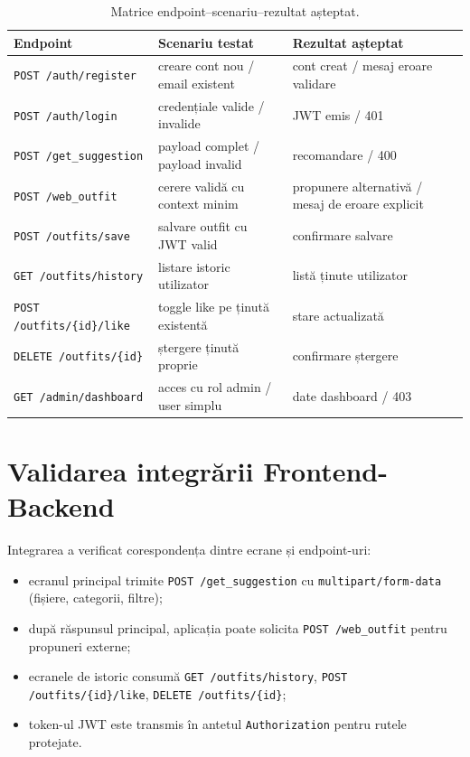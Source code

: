 \begin{table}[h]
    \centering
    \begin{tabular}{|p{3.8cm}|p{5cm}|p{3.2cm}|}
    \hline
    \textbf{Endpoint} & \textbf{Scenariu testat} & \textbf{Rezultat așteptat} \\ \hline
    \texttt{POST /auth/register} & creare cont nou / email existent & cont creat / mesaj eroare validare \\ \hline
    \texttt{POST /auth/login} & credențiale valide / invalide & JWT emis / 401 \\ \hline
    \texttt{POST /get\_suggestion} & payload complet / payload invalid & recomandare / 400 \\ \hline
    \texttt{POST /web\_outfit} & cerere validă cu context minim & propunere alternativă / mesaj de eroare explicit \\ \hline
    \texttt{POST /outfits/save} & salvare outfit cu JWT valid & confirmare salvare \\ \hline
    \texttt{GET /outfits/history} & listare istoric utilizator & listă ținute utilizator \\ \hline
    \texttt{POST /outfits/\{id\}/like} & toggle like pe ținută existentă & stare actualizată \\ \hline
    \texttt{DELETE /outfits/\{id\}} & ștergere ținută proprie & confirmare ștergere \\ \hline
    \texttt{GET /admin/dashboard} & acces cu rol admin / user simplu & date dashboard / 403 \\ \hline
    \end{tabular}
    \caption{Matrice endpoint--scenariu--rezultat așteptat.}
    \label{tab:endpoint_matrix}
\end{table}

\section{Validarea integrării Frontend-Backend}
Integrarea a verificat corespondența dintre ecrane și endpoint-uri:
\begin{itemize}
    \item ecranul principal trimite \texttt{POST /get\_suggestion} cu \texttt{multipart/form-data} (fișiere, categorii, filtre);
    \item după răspunsul principal, aplicația poate solicita \texttt{POST /web\_outfit} pentru propuneri externe;
    \item ecranele de istoric consumă \texttt{GET /outfits/history}, \texttt{POST /outfits/\{id\}/like}, \texttt{DELETE /outfits/\{id\}};
    \item token-ul JWT este transmis în antetul \texttt{Authorization} pentru rutele protejate.
\end{itemize}

